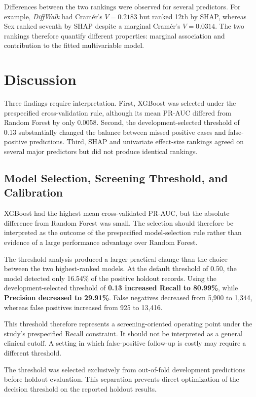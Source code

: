 \documentclass[pdflatex,sn-basic,Numbered]{sn-jnl}
\begin{document}
Differences between the two rankings were observed for several predictors.
For example, \textit{DiffWalk} had Cram{\'e}r's $V=0.2183$ but ranked
12th by SHAP, whereas Sex ranked seventh by SHAP despite a marginal
Cram{\'e}r's $V=0.0314$.
The two rankings therefore quantify different properties: marginal
association and contribution to the fitted multivariable model.

\section{Discussion}
\label{sec:discussion}

Three findings require interpretation.
First, XGBoost was selected under the prespecified cross-validation rule,
although its mean PR-AUC differed from Random Forest by only 0.0058.
Second, the development-selected threshold of 0.13 substantially changed
the balance between missed positive cases and false-positive predictions.
Third, SHAP and univariate effect-size rankings agreed on several major
predictors but did not produce identical rankings.


\subsection{Model Selection, Screening Threshold, and Calibration}
\label{subsec:model_discussion}

XGBoost had the highest mean cross-validated PR-AUC, but the absolute
difference from Random Forest was small.
The selection should therefore be interpreted as the outcome of the
prespecified model-selection rule rather than evidence of a large
performance advantage over Random Forest.

The threshold analysis produced a larger practical change than the choice
between the two highest-ranked models.
At the default threshold of 0.50, the model detected only 16.54\% of the
positive holdout records.
Using the development-selected threshold of
\textbf{0.13 increased Recall to 80.99\%}, while
\textbf{Precision decreased to 29.91\%}.
False negatives decreased from 5,900 to 1,344, whereas false positives
increased from 925 to 13,416.

This threshold therefore represents a screening-oriented operating point
under the study's prespecified Recall constraint.
It should not be interpreted as a general clinical cutoff.
A setting in which false-positive follow-up is costly may require a
different threshold.

The threshold was selected exclusively from out-of-fold development
predictions before holdout evaluation.
This separation prevents direct optimization of the decision threshold on
the reported holdout results.
\end{document}
